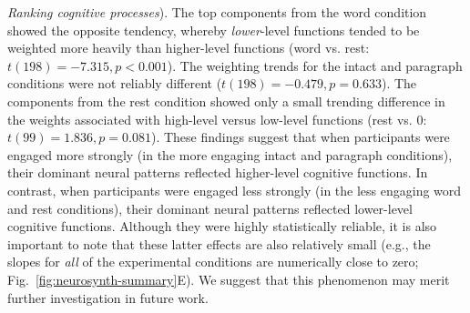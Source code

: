 \documentclass[english, 11pt]{article}
\begin{document}
\textit{Ranking cognitive processes}). The top components from the word
condition showed the opposite tendency, whereby \textit{lower}-level functions
tended to be weighted more heavily than higher-level functions (word vs. rest:
$t(198) = -7.315, p < 0.001$). The weighting trends for the intact and
paragraph conditions were not reliably different ($t(198) = -0.479, p =
0.633$). The components from the rest condition showed only a small trending
difference in the weights associated with high-level versus low-level functions
(rest vs. 0: $t(99) = 1.836, p = 0.081$). These findings suggest that when
participants were engaged more strongly (in the more engaging intact and
paragraph conditions), their dominant neural patterns reflected higher-level
cognitive functions. In contrast, when participants were engaged less strongly
(in the less engaging word and rest conditions), their dominant neural patterns
reflected lower-level cognitive functions. Although they were highly
statistically reliable, it is also important to note that these latter effects
are also relatively small (e.g., the slopes for \textit{all} of the
experimental conditions are numerically close to zero;
Fig.~\ref{fig:neurosynth-summary}E). We suggest that this phenomenon may merit
further investigation in future work.
\end{document}
